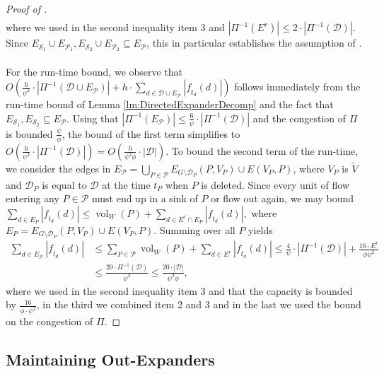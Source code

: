 \documentclass[11pt]{article}
\newcommand\ff{\boldsymbol{\mathit{f}}}
\DeclareMathOperator{\vol}{vol}
\begin{document}
\begin{proof}[Proof of ]
\begin{align*}
    \end{align*}
    where we used in the second inequality item 3 and $|\Pi^{-1}(E^r)| \leq 2 \cdot |\Pi^{-1}(\mathcal{D})|$. Since $E_{\mathcal{S}_1} \cup E_{\mathcal{P}_1}, E_{\mathcal{S}_2} 
    \cup E_{\mathcal{P}_2} \subseteq E_{\mathcal{P}}$, this in particular establishes the assumption of .\\
    \\
    For the run-time bound, we observe that $O\left(\frac{h}{\psi^2} \cdot |\Pi^{-1}(\mathcal{D} \cup E_{\mathcal{P}})| + h \cdot \sum_{d \in \mathcal{D} \cup E_{\mathcal{P}}} |\ff_{t_d}(d)| \right)$ follows immediately from the run-time bound of Lemma \ref{lm:DirectedExpanderDecomp} and the fact that $E_{\mathcal{S}_1}, E_{\mathcal{S}_2} \subseteq E_{\mathcal{P}}$. Using that $|\Pi^{-1}(E_{\mathcal{P}})| \leq \frac{6}{\psi} \cdot |\Pi^{-1}(\mathcal{D})|$ and the congestion of $\Pi$ is bounded $\frac{\psi}{\phi}$, the bound of the first term simplifies to $O\left(\frac{h}{\psi^3} \cdot |\Pi^{-1}(\mathcal{D})| \right) = O\left(\frac{h}{\psi^2 \phi} \cdot |\mathcal{D}| \right)$. To bound the second term of the run-time, we consider the edges in $E_{\mathcal{P}} = \bigcup_{P \in \mathcal{P}} E_{G \setminus \mathcal{D}_P}(P,V_P) \cup E(V_P, P)$, where $V_P$ is $\tilde{V}$ and $\mathcal{D}_P$ is equal to $\mathcal{D}$ at the time $t_P$ when $P$ is deleted. Since every unit of flow entering any $P \in \mathcal{P}$ must end up in a sink of $P$ or flow out again, we may bound $\sum_{d \in E_{P}} |\ff_{t_d}(d)| \leq \vol_W(P) + \sum_{d \in E^r \cap E_P} |\ff_{t_d}(d)|,$ where $E_P = E_{G \setminus \mathcal{D}_P}(P,V_P) \cup E(V_P, P)$. Summing over all $P$ yields 
    \begin{align*}
        \sum_{d \in E_{\mathcal{P}}} |\ff_{t_d}(d)| &\leq \sum_{P \in \mathcal{P}} \vol_W(P) + \sum_{d \in E^r} |\ff_{t_d}(d)| \leq \frac{4}{\psi} \cdot |\Pi^{-1}(\mathcal{D})| + \frac{16 \cdot E^r}{\phi \psi^2} \\
        &\leq \frac{20 \cdot \Pi^{-1}(\mathcal{D})}{\psi^3} \leq \frac{20 \cdot |\mathcal{D}|}{\psi^2 \phi},
    \end{align*}
    where we used in the second inequality item 3 and that the capacity is bounded by $\frac{16}{\phi \cdot \psi^2}$, in the third we combined item 2 and 3 and in the last we used the bound on the congestion of $\Pi$. 
\end{proof}

\subsection{Maintaining Out-Expanders}
\label{subsec:outExpan}
\end{document}
